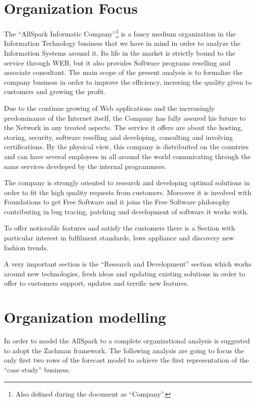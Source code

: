 \chapter{Organization Focus}
\label{chap:Organization_focus}
The ``AllSpark Informatic Company''\footnote{Also defined during the document as ``Company''.} is a fancy medium organization in the Information Technology business that we have in mind in order to analyze the Information Systems around it. Its life in the market is strictly bound to the service through WEB, but it also provides Software programs reselling and associate consultant. The main scope of the present analysis is to formalize the company business in order to improve the efficiency, incresing the quality given to customers and growing the profit.


Due to the continue growing of Web applications and the increasingly predominance of the Internet itself, the Company has fully assured his future to the Network in any treated aspects. The service it offers are about the hosting, storing, security, software reselling and developing, consulting and involving certifications. By the physical view, this company is distribuited on the countries and can have several employees in all around the world comunicating through the same services develeped by the internal programmers.


The company is strongly oriented to research and developing optimal solutions in order to fit the high quality requests from customers. Moreover it is involved with Foundations to get Free Software and it joins the Free Software philosophy contributing in bug tracing, patching and development of software it works with.


To offer noticeable features and satisfy the customers there is a Section with particular interest in fulfilment standards, laws appliance and discovery new fashion trends.


A very important section is the ``Research and Development'' section which works around new technologies, fresh ideas and updating existing solutions in order to offer to customers support, updates and terrific new features.



\chapter{Organization modelling}
\label{chap:Organization_modelling}
In order to model the AllSpark to a complete organizational analysis is suggested to adopt the Zachman framework. The following analysis are going to focus the only first two rows of the forecast model to achieve the first representation of the ``case study'' business.

